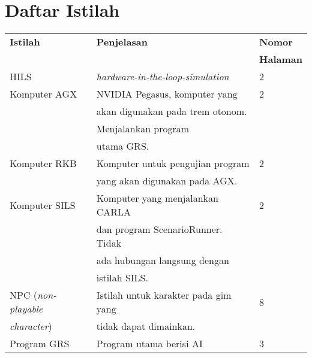 \chapter*{Daftar Istilah}

\begin{table*}[!ht]
	\centering
	\begin{tabular}{|l|l|l|}
		\hline
		\textbf{Istilah}           & \textbf{Penjelasan}                          & \textbf{Nomor}   \\
		                           &                                              & \textbf{Halaman} \\
		\hline
		HILS                       & \textit{hardware-in-the-loop-simulation}     & 2                \\
		\hline
		Komputer AGX               & NVIDIA Pegasus, komputer yang                & 2                \\
		                           & akan digunakan pada trem otonom.             &                  \\
		                           & Menjalankan program                          &                  \\
		                           & utama GRS.                                   &                  \\
		\hline
		Komputer RKB               & Komputer untuk pengujian program             & 2                \\
		                           & yang akan digunakan pada AGX.                &                  \\
		\hline
		Komputer SILS              & Komputer yang menjalankan CARLA              & 2                \\
		                           & dan program ScenarioRunner. Tidak            &                  \\
		                           & ada hubungan langsung dengan                 &                  \\
		                           & istilah SILS.                                &                  \\
		\hline
		NPC (\textit{non-playable} & Istilah untuk karakter pada gim yang         & 8                \\
		\textit{character})        & tidak dapat dimainkan.                       &                  \\
		\hline
		Program GRS                & Program utama berisi AI                      & 3                \\

\end{tabular}
\end{table*}
